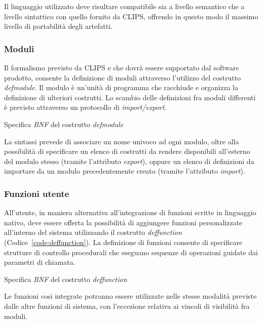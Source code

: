 Il linguaggio utilizzato deve risultare compatibile sia a livello semantico che a livello sintattico con quello fornito da CLIPS, offrendo in questo modo il massimo livello di portabilità degli artefatti.

\subsubsection{Moduli}\label{par:linguaggio-moduli}
Il formalismo previsto da CLIPS e che dovrà essere supportato dal software prodotto, consente la definizione di moduli attraverso l'utilizzo del costrutto \emph{defmodule}.
Il modulo è un'unità di programma che racchiude e organizza la definizione di ulteriori costrutti. Lo scambio delle definizioni fra moduli differenti è previsto attraverso un protocollo di \emph{import/export}.

\begin{program}
\caption{Specifica \emph{BNF} del costrutto \emph{defmodule}}
\end{program}

La sintassi prevede di associare un nome univoco ad ogni modulo, oltre alla possibilità di specificare un elenco di costrutti da rendere disponibili all'esterno del modulo stesso (tramite l'attributo \emph{export}), oppure un elenco di definizioni da importare da un modulo precedentemente creato (tramite l'attributo \emph{import}).


\subsubsection{Funzioni utente}\label{par:linguaggio-funzioni}
All'utente, in maniera alternativa all'integrazione di funzioni scritte in linguaggio nativo, deve essere offerta la possibilità di aggiungere funzioni personalizzate all'interno del sistema utilizzando il costrutto \emph{deffunction} (Codice~\ref{code:deffunction}). La definizione di funzioni consente di specificare strutture di controllo procedurali che eseguano sequenze di operazioni guidate dai parametri di chiamata.

\begin{program}
\caption{Specifica \emph{BNF} del costrutto \emph{deffunction}}\label{code:deffunction}
\end{program}


Le funzioni cosi integrate potranno essere utilizzate nelle stesse modalità previste dalle altre funzioni di sistema, con l'eccezione relativa ai vincoli di visibilità fra moduli.

